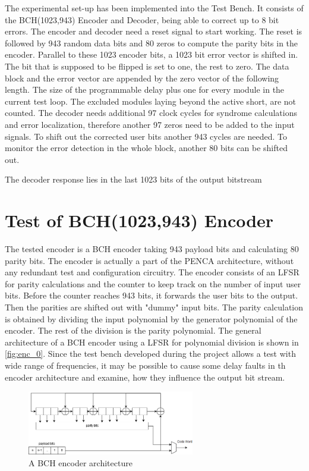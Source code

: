 The experimental set-up has been implemented into the Test Bench. It consists of the BCH(1023,943) Encoder and Decoder, being able to correct up to 8 bit errors. The encoder and decoder need a reset signal to start working. The reset is followed by 943 random data bits and 80 zeros to compute the parity bits in the encoder. Parallel to these 1023 encoder bits, a 1023 bit error vector is shifted in. The bit that is supposed to be flipped is set to one, the rest to zero. The data block and the error vector are appended by the zero vector of the following length. The size of the programmable delay plus one for every module in the current test loop. The excluded modules laying beyond the active short, are not counted. The decoder needs additional 97 clock cycles for syndrome calculations and error localization, therefore another 97 zeros need to be added to the input signals. To shift out the corrected user bits another 943 cycles are needed. To monitor the error detection in the whole block, another 80 bits can be shifted out.

The decoder response lies in the last 1023 bits of the output bitstream

\section{Test of BCH(1023,943) Encoder}
The tested encoder is a BCH encoder taking 943 payload bits and calculating 80 parity bits. The encoder is actually a part of the PENCA architecture, without any redundant test and configuration circuitry. The encoder consists of an LFSR for parity calculations and the counter to keep track on the number of input user bits. Before the counter reaches 943 bits, it forwards the user bits to the output. Then the parities are shifted out with "dummy" input bits. The parity calculation is obtained by dividing the input polynomial by the generator polynomial of the encoder. The rest of the division is the parity polynomial. The general architecture of a BCH encoder using a LFSR for polynomial division is shown in \autoref{fig:enc_0}. Since the test bench developed during the project allows a test with wide range of frequencies, it may be possible to cause some delay faults in th encoder architecture and examine, how they influence the output bit stream.

\begin{figure}[h]
\centering
\includegraphics[width=0.65\textwidth]{figures/BCH_ENC.png}
\caption{A BCH encoder architecture \cite{art:BCH_implement}}
\label{fig:enc_0}
\end{figure}

